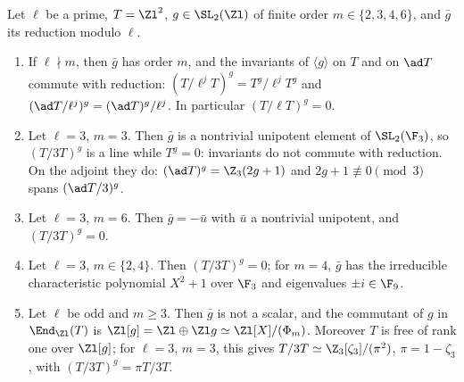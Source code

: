 \begin{proposition}\label{prop:reps:reduction-cyclic}
Let $\ell$ be a prime, $T=\Zl^2$, $g\in\SL_2(\Zl)$ of finite order $m\in\{2,3,4,6\}$, and $\bar g$ its reduction modulo $\ell$.
\begin{enumerate}[label=(\roman*)]
\item If $\ell\nmid m$, then $\bar g$ has order $m$, and the invariants of $\langle g\rangle$ on $T$ and on $\ad T$ commute with reduction:
$(T/\ell^jT)^g=T^g/\ell^jT^g$ and $(\ad T/\ell^j)^g=(\ad T)^g/\ell^j$. In particular $(T/\ell T)^g=0$.
\item Let $\ell=3$, $m=3$. Then $\bar g$ is a nontrivial unipotent element of $\SL_2(\F_3)$, so $(T/3T)^g$ is a line while $T^g=0$: invariants do not
commute with reduction. On the adjoint they do: $(\ad T)^g=\Z_3(2g+1)$ and $2g+1\not\equiv0\pmod 3$ spans $(\ad T/3)^g$.
\item Let $\ell=3$, $m=6$. Then $\bar g=-\bar u$ with $\bar u$ a nontrivial unipotent, and $(T/3T)^g=0$.
\item Let $\ell=3$, $m\in\{2,4\}$. Then $(T/3T)^g=0$; for $m=4$, $\bar g$ has the irreducible characteristic polynomial $X^2+1$ over $\F_3$ and eigenvalues
$\pm i\in\F_9$.
\item Let $\ell$ be odd and $m\ge3$. Then $\bar g$ is not a scalar, and the commutant of $g$ in $\End_{\Zl}(T)$ is $\Zl[g]=\Zl\oplus\Zl g\simeq\Zl[X]/(\Phi_m)$. Moreover $T$
is free of rank one over $\Zl[g]$; for $\ell=3$, $m=3$, this gives $T/3T\simeq\Z_3[\zeta_3]/(\pi^2)$, $\pi=1-\zeta_3$, with $(T/3T)^g=\pi T/3T$.
\end{enumerate}
\end{proposition}

